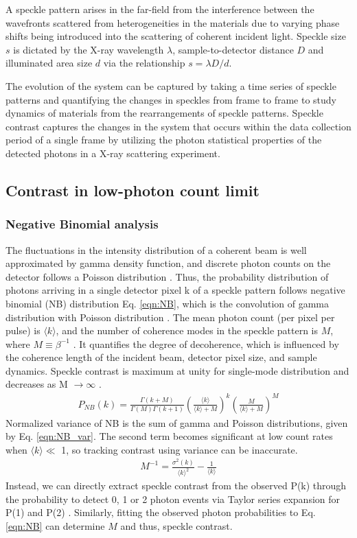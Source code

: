 \documentclass[11pt]{article}
\theoremstyle{definition}
\newcommand{\kk}{\langle k \rangle}
\begin{document}
A speckle pattern arises in the far-field from the interference between the wavefronts scattered from heterogeneities in the materials due to varying phase shifts being introduced into the scattering of coherent incident light. Speckle size \(s\) is dictated by the X-ray wavelength \(\lambda\), sample-to-detector distance \(D\) and illuminated area size \(d\) via the relationship \(s = \lambda D/d \). 

The evolution of the system can be captured by taking a time series of speckle patterns and quantifying the changes in speckles from frame to frame to study dynamics of materials from the rearrangements of speckle patterns. Speckle contrast captures the changes in the system that occurs within the data collection period of a single frame by utilizing the photon statistical properties of the detected photons in a X-ray scattering experiment. 

\subsection{Contrast in low-photon count limit}
\subsubsection{Negative Binomial analysis}
The fluctuations in the intensity distribution of a coherent beam is well approximated by gamma density function, and discrete photon counts on the detector follows a Poisson distribution \cite{goodman_speckle_2020}. Thus, the probability distribution of photons arriving in a single detector pixel k of a speckle pattern follows negative binomial (NB) distribution Eq. \ref{eqn:NB}, which is the convolution of gamma distribution with Poisson distribution \cite{goodman_speckle_2020}. The mean photon count (per pixel per pulse) is $\kk$, and the number of coherence modes in the speckle pattern is \( M \), where \(M \equiv \beta^{-1} \) \cite{hruszkewycz_high_2012}. It quantifies the degree of decoherence, which is influenced by the coherence length of the incident beam, detector pixel size, and sample dynamics. Speckle contrast is maximum at unity for single-mode distribution and decreases as M $\rightarrow \infty$ \cite{hruszkewycz_high_2012}. 
\begin{align}\label{eqn:NB}
P_{NB}(k) = \frac{\Gamma(k+M)}{\Gamma(M)\Gamma(k+1)} \left(\frac{\kk}{\kk+M}\right)^k \left(\frac{M}{\kk +M}\right)^M
\end{align}
Normalized variance of NB is the sum of gamma and Poisson distributions, given by Eq. \ref{eqn:NB_var}. The second term becomes significant at low count rates when $\langle k \rangle \ll$ 1, so tracking contrast using variance can be inaccurate. 
\begin{align}\label{eqn:NB_var}
M^{-1} = \frac{\sigma^2(k)}{\kk^2} - \frac{1}{\kk}
\end{align}
Instead, we can directly extract speckle contrast from the observed P(k) through the probability to detect 0, 1 or 2 photon events via Taylor series expansion for P(1) and P(2) \cite{hruszkewycz_high_2012}. Similarly, fitting the observed photon probabilities to Eq. \ref{eqn:NB} can determine \( M \) and thus, speckle contrast.
\end{document}
